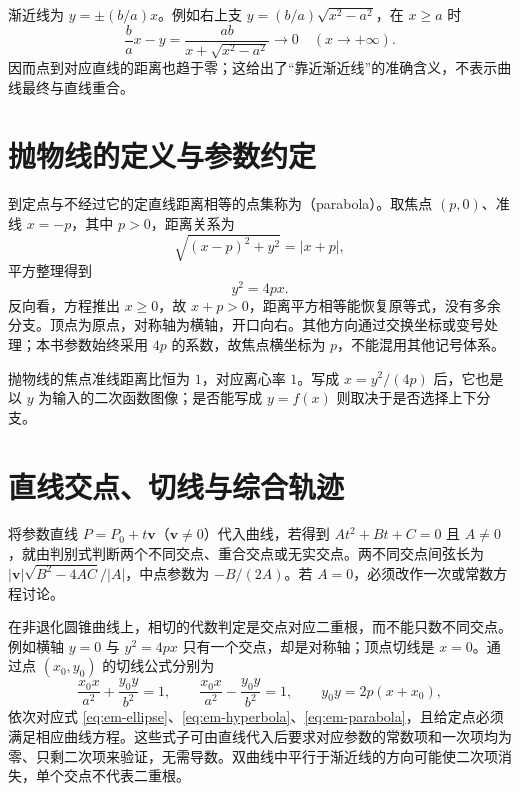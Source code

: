 \documentclass[UTF8]{ctexbook}
\begin{document}
渐近线为 $y=\pm(b/a)x$。例如右上支 $y=(b/a)\sqrt{x^2-a^2}$，在 $x\ge a$ 时
\[
 \frac ba x-y=\frac{ab}{x+\sqrt{x^2-a^2}}\longrightarrow0
 \quad(x\longrightarrow+\infty).
\]
因而点到对应直线的距离也趋于零；这给出了“靠近渐近线”的准确含义，不表示曲线最终与直线重合。

\section{抛物线的定义与参数约定}
到定点与不经过它的定直线距离相等的点集称为（parabola）。取焦点 $(p,0)$、准线 $x=-p$，其中 $p>0$，距离关系为
\[
 \sqrt{(x-p)^2+y^2}=|x+p|,
\]
平方整理得到
\begin{equation}\label{eq:em-parabola}
 y^2=4px.
\end{equation}
反向看，方程推出 $x\ge0$，故 $x+p>0$，距离平方相等能恢复原等式，没有多余分支。顶点为原点，对称轴为横轴，开口向右。其他方向通过交换坐标或变号处理；本书参数始终采用 $4p$ 的系数，故焦点横坐标为 $p$，不能混用其他记号体系。

抛物线的焦点准线距离比恒为 $1$，对应离心率 $1$。写成 $x=y^2/(4p)$ 后，它也是以 $y$ 为输入的二次函数图像；是否能写成 $y=f(x)$ 则取决于是否选择上下分支。

\section{直线交点、切线与综合轨迹}
将参数直线 $P=P_0+t\boldsymbol v$（$\boldsymbol v\ne0$）代入曲线，若得到 $At^2+Bt+C=0$ 且 $A\ne0$，就由判别式判断两个不同交点、重合交点或无实交点。两不同交点间弦长为 $|\boldsymbol v|\sqrt{B^2-4AC}/|A|$，中点参数为 $-B/(2A)$。若 $A=0$，必须改作一次或常数方程讨论。

在非退化圆锥曲线上，相切的代数判定是交点对应二重根，而不能只数不同交点。例如横轴 $y=0$ 与 $y^2=4px$ 只有一个交点，却是对称轴；顶点切线是 $x=0$。通过点 $(x_0,y_0)$ 的切线公式分别为
\[
 \frac{x_0x}{a^2}+\frac{y_0y}{b^2}=1,\qquad
 \frac{x_0x}{a^2}-\frac{y_0y}{b^2}=1,\qquad
 y_0y=2p(x+x_0),
\]
依次对应式 \eqref{eq:em-ellipse}、\eqref{eq:em-hyperbola}、\eqref{eq:em-parabola}，且给定点必须满足相应曲线方程。这些式子可由直线代入后要求对应参数的常数项和一次项均为零、只剩二次项来验证，无需导数。双曲线中平行于渐近线的方向可能使二次项消失，单个交点不代表二重根。
\end{document}
